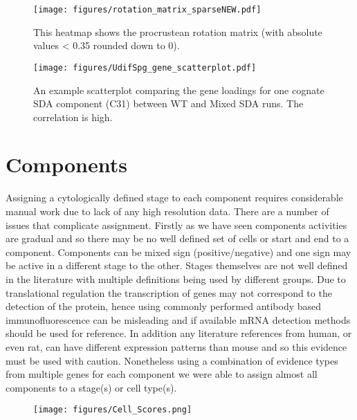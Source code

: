 \begin{figure}[H]
	\centering
	\texttt{[image: figures/rotation\_matrix\_sparseNEW.pdf]}
	\caption{This heatmap shows the procrustean rotation matrix (with absolute values < 0.35 rounded down to 0).}
	\label{fig:WT_Mix_Rotation}
\end{figure}

\begin{figure}[H]
	\centering
	\texttt{[image: figures/UdifSpg\_gene\_scatterplot.pdf]}
	\caption{An example scatterplot comparing the gene loadings for one cognate SDA component (C31) between WT and Mixed SDA runs. The correlation is high.}
	\label{fig:WT_Mix_Correlation}
\end{figure}




\section{Components}

Assigning a cytologically defined stage to each component requires considerable manual work due to lack of any high resolution data. There are a number of issues that complicate assignment. Firstly as we have seen components activities are gradual and so there may be no well defined set of cells or start and end to a component. Components can be mixed sign (positive/negative) and one sign may be active in a different stage to the other. Stages themselves are not well defined in the literature with multiple definitions being used by different groups. Due to translational regulation the transcription of genes may not correspond to the detection of the protein, hence using commonly performed antibody based immunofluorescence can be misleading and if available mRNA detection methods should be used for reference. In addition any literature references from human, or even rat, can have different expression patterns than mouse and so this evidence must be used with caution. Nonetheless using a combination of evidence types from multiple genes for each component we were able to assign almost all components to a stage(s) or cell type(s).


\begin{figure}[H]
	\centering
	\texttt{[image: figures/Cell\_Scores.png]}
	\caption{}
	\label{fig:Cell_Scores}
\end{figure}




